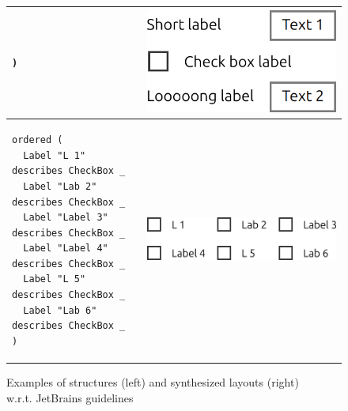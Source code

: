\begin{figure}
\begin{tabular}{m{85mm}m{6cm}}
\begin{lstlisting}[basicstyle=\small]
)
      \end{lstlisting} &
      \vspace{1em}\includegraphics[scale=0.4]{Example4-Qt-QML.png} \\
      \hline
      \begin{lstlisting}[basicstyle=\small]
ordered (
  Label "L 1"     describes CheckBox _
  Label "Lab 2"   describes CheckBox _
  Label "Label 3" describes CheckBox _
  Label "Label 4" describes CheckBox _
  Label "L 5"     describes CheckBox _
  Label "Lab 6"   describes CheckBox _
)
      \end{lstlisting} &
      \includegraphics[scale=0.4]{Example5-Qt-QML.png} \\
    \end{tabular}
    \caption{Examples of structures (left) and synthesized layouts (right)\\
      w.r.t. JetBrains guidelines}
    \label{fig:evaluation}
  \end{figure}
